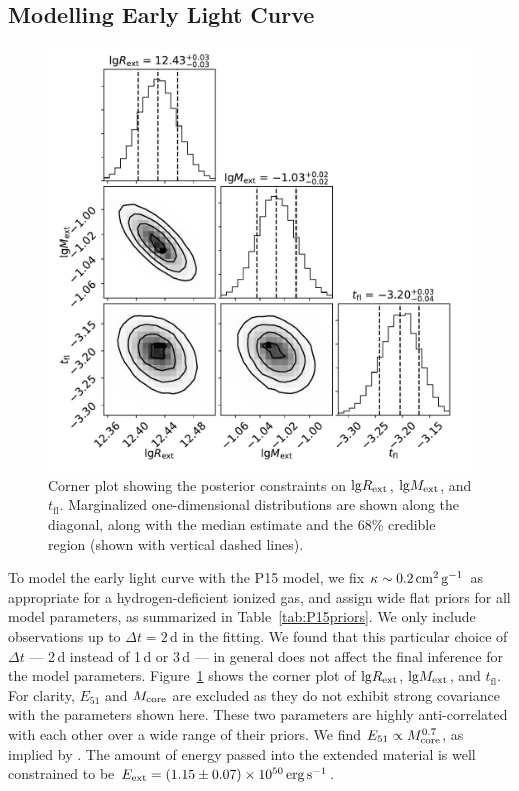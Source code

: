 \documentclass[twocolumn]{aastex63}
\begin{document}
\begin{CJK*}{UTF8}{gbsn}
\subsection{Modelling Early Light Curve} \label{subsec:p15fit}


\begin{figure}[htbp!]
	\centering
	\includegraphics[width=\columnwidth]{figures/corner_P15.pdf}
	\caption{Corner plot showing the posterior constraints on ${\rm lg}R_{\rm ext}$, ${\rm lg}M_{\rm 
			ext}$, and $t_\mathrm{fl}$. Marginalized one-dimensional distributions are shown along the 
		diagonal, along with the median estimate and the 68\% credible region (shown with vertical 
		dashed 
		lines).	\label{fig:pirocorner}}
\end{figure}
To model the early light curve with the P15 model, we fix $\kappa\sim0.2\,{\rm cm^2\, g^{-1}}$ as 
appropriate for a hydrogen-deficient ionized gas, and assign wide flat priors for all model parameters, 
as summarized in Table~\ref{tab:P15priors}. We only include observations up to $\Delta t = 2$\,d in 
the fitting. We found that this particular choice of $\Delta t$ --- 2\,d instead of 1\,d or 3\,d --- in 
general does not affect the final inference for the model parameters. Figure~\ref{fig:pirocorner} shows 
the corner plot of ${\rm lg}R_{\rm ext}$, ${\rm lg}M_{\rm 	ext}$, and $t_\mathrm{fl}$. For clarity, 
$E_{51}$ and $M_{\rm core}$ are excluded as they do not exhibit strong covariance with the 
parameters shown here. These two parameters are highly anti-correlated with each other over a wide 
range of their priors. We find $E_{51}\propto M_{\rm core}^{0.7}$, as implied by 
\citet[][Eq~3]{Piro2015}. The amount of energy passed into the extended material is well constrained to 
be $E_{\rm ext} = (1.15\pm 0.07) \times 10^{50}\,{\rm erg\, s^{-1}}$.


\end{CJK*}
\end{document}
